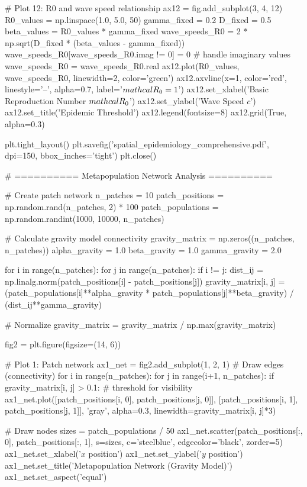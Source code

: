 \documentclass[a4paper, 11pt]{article}
\begin{document}
\begin{pycode}
# Plot 12: R0 and wave speed relationship
ax12 = fig.add_subplot(3, 4, 12)
R0_values = np.linspace(1.0, 5.0, 50)
gamma_fixed = 0.2
D_fixed = 0.5
beta_values = R0_values * gamma_fixed
wave_speeds_R0 = 2 * np.sqrt(D_fixed * (beta_values - gamma_fixed))
wave_speeds_R0[wave_speeds_R0.imag != 0] = 0  # handle imaginary values
wave_speeds_R0 = wave_speeds_R0.real
ax12.plot(R0_values, wave_speeds_R0, linewidth=2, color='green')
ax12.axvline(x=1, color='red', linestyle='--', alpha=0.7, label='$\\mathcal{R}_0 = 1$')
ax12.set_xlabel('Basic Reproduction Number $\\mathcal{R}_0$')
ax12.set_ylabel('Wave Speed $c$')
ax12.set_title('Epidemic Threshold')
ax12.legend(fontsize=8)
ax12.grid(True, alpha=0.3)

plt.tight_layout()
plt.savefig('spatial_epidemiology_comprehensive.pdf', dpi=150, bbox_inches='tight')
plt.close()

# ========== Metapopulation Network Analysis ==========

# Create patch network
n_patches = 10
patch_positions = np.random.rand(n_patches, 2) * 100
patch_populations = np.random.randint(1000, 10000, n_patches)

# Calculate gravity model connectivity
gravity_matrix = np.zeros((n_patches, n_patches))
alpha_gravity = 1.0
beta_gravity = 1.0
gamma_gravity = 2.0

for i in range(n_patches):
    for j in range(n_patches):
        if i != j:
            dist_ij = np.linalg.norm(patch_positions[i] - patch_positions[j])
            gravity_matrix[i, j] = (patch_populations[i]**alpha_gravity *
                                   patch_populations[j]**beta_gravity) / (dist_ij**gamma_gravity)

# Normalize
gravity_matrix = gravity_matrix / np.max(gravity_matrix)

fig2 = plt.figure(figsize=(14, 6))

# Plot 1: Patch network
ax1_net = fig2.add_subplot(1, 2, 1)
# Draw edges (connectivity)
for i in range(n_patches):
    for j in range(i+1, n_patches):
        if gravity_matrix[i, j] > 0.1:  # threshold for visibility
            ax1_net.plot([patch_positions[i, 0], patch_positions[j, 0]],
                        [patch_positions[i, 1], patch_positions[j, 1]],
                        'gray', alpha=0.3, linewidth=gravity_matrix[i, j]*3)

# Draw nodes
sizes = patch_populations / 50
ax1_net.scatter(patch_positions[:, 0], patch_positions[:, 1],
               s=sizes, c='steelblue', edgecolor='black', zorder=5)
ax1_net.set_xlabel('$x$ position')
ax1_net.set_ylabel('$y$ position')
ax1_net.set_title('Metapopulation Network (Gravity Model)')
ax1_net.set_aspect('equal')


\end{pycode}
\end{document}
